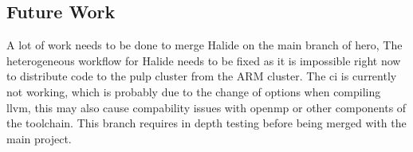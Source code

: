 \subsection{Future Work}
A lot of work needs to be done to merge Halide on the main branch of \gls{hero}, The heterogeneous workflow for Halide needs to be fixed as it is  impossible right now to distribute code to the \gls{pulp} cluster from the ARM cluster. 
The \gls{ci} is currently not working, which is probably due to the change of options when compiling \gls{llvm}, this may also cause compability issues with \gls{openmp} or other components of the toolchain. This branch requires in depth testing before being merged with the main project.




